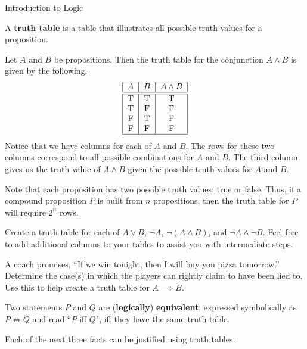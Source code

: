 \begin{section}{Introduction to Logic}
\begin{definition}
A \textbf{truth table} is a table that illustrates all possible truth values for a proposition.  
\end{definition}

\begin{example}
Let $A$ and $B$ be propositions.  Then the truth table for the conjunction $A\wedge B$ is given by the following.
\[
\begin{tabular}{| c | c  | c |} \hline
$A$  &  $B$ & $A \wedge B$  \\ \hline\hline
T & T & T  \\ 
T & F & F  \\ 
F & T & F  \\ 
F & F & F  \\ \hline
\end{tabular}
\]
Notice that we have columns for each of $A$ and $B$.  The rows for these two columns correspond to all possible combinations for $A$ and $B$.  The third column gives us the truth value of $A\wedge B$ given the possible truth values for $A$ and $B$.
\end{example}

Note that each proposition has two possible truth values: true or false. Thus, if a compound proposition $P$ is built from $n$ propositions, then the truth table for $P$ will require $2^n$ rows.

\begin{exercise}
Create a truth table for each of $A \vee B$, $\neg A$, $\neg (A \wedge B)$, and $\neg A \wedge \neg B$.  Feel free to add additional columns to your tables to assist you with intermediate steps.
\end{exercise}

\begin{problem}
A coach promises, ``If we win tonight, then I will buy you pizza tomorrow.''  Determine the case(s) in which the players can rightly claim to have been lied to. Use this to help create a truth table for $A \implies B$.
\end{problem}

\begin{definition}
Two statements $P$ and $Q$ are (\textbf{logically}) \textbf{equivalent}, expressed symbolically as $\boxed{P\iff Q}$ and read ``$P$ iff $Q$", iff they have the same truth table.
\end{definition}

Each of the next three facts can be justified using truth tables.


\end{section}
